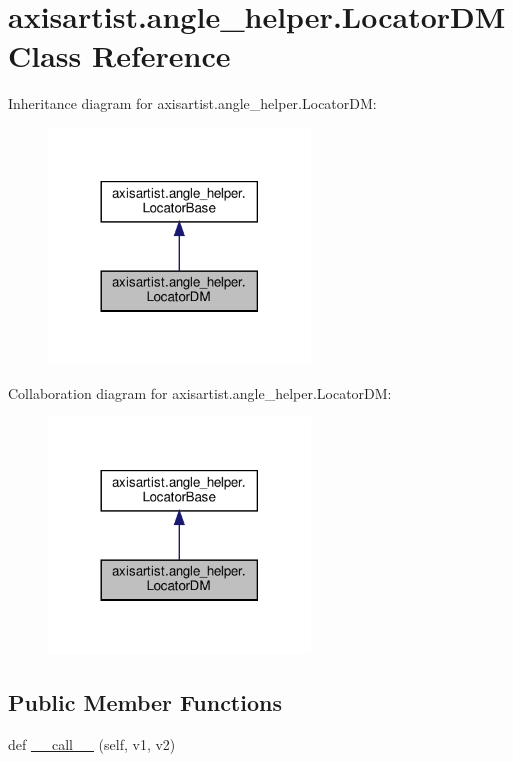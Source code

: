 \hypertarget{classaxisartist_1_1angle__helper_1_1LocatorDM}{}\section{axisartist.\+angle\+\_\+helper.\+Locator\+DM Class Reference}
\label{classaxisartist_1_1angle__helper_1_1LocatorDM}


Inheritance diagram for axisartist.\+angle\+\_\+helper.\+Locator\+DM\+:
\nopagebreak
\begin{figure}[H]
\begin{center}
\leavevmode
\includegraphics[width=197pt]{classaxisartist_1_1angle__helper_1_1LocatorDM__inherit__graph}
\end{center}
\end{figure}


Collaboration diagram for axisartist.\+angle\+\_\+helper.\+Locator\+DM\+:
\nopagebreak
\begin{figure}[H]
\begin{center}
\leavevmode
\includegraphics[width=197pt]{classaxisartist_1_1angle__helper_1_1LocatorDM__coll__graph}
\end{center}
\end{figure}
\subsection*{Public Member Functions}
\begin{DoxyCompactItemize}
\item 
def \hyperlink{classaxisartist_1_1angle__helper_1_1LocatorDM_af7bd5dabcd2de906ee3655b737f16bdb}{\+\_\+\+\_\+call\+\_\+\+\_\+} (self, v1, v2)
\end{DoxyCompactItemize}
